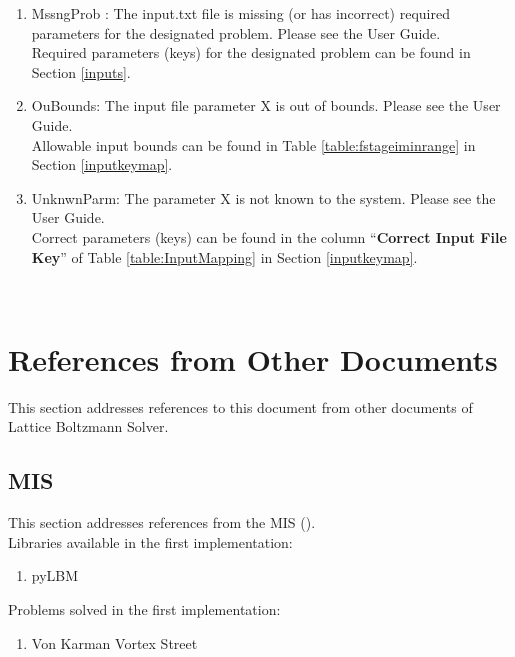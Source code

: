 \documentclass[12pt, titlepage]{article}
\newcommand{\myprogname}{Lattice Boltzmann Solver}
\begin{document}
\begin{enumerate}
	\item MssngProb : The input.txt file is missing (or has incorrect) required parameters for the designated problem. Please see the User Guide.\\
	
	Required parameters (keys) for the designated problem can be found in Section \ref{inputs}.\\
	
	\item OuBounds: The input file parameter X is out of bounds. Please see the
	User Guide.\\ 
	
	Allowable input bounds can be found in Table \ref{table:fstageiminrange} in Section \ref{inputkeymap}.\\
	
	\item UnknwnParm: The parameter X is not known to the system. Please see
	the User Guide.\\
	
	Correct parameters (keys) can be found in the column ``\textbf{Correct Input File Key}'' of Table \ref{table:InputMapping} in Section \ref{inputkeymap}.\\
\end{enumerate}

~\newpage

\section{References from Other Documents}
\label{otherdocs}
This section addresses references to this document from other documents of {\myprogname}.
	
\subsection{MIS}

This section addresses references from the MIS (\citet{LBM_MIS_PM}).\\

Libraries available in the first implementation:
\begin{enumerate}
	\item pyLBM
\end{enumerate}

Problems solved in the first implementation:
\begin{enumerate}
	\item Von Karman Vortex Street
\end{enumerate}
\end{document}
